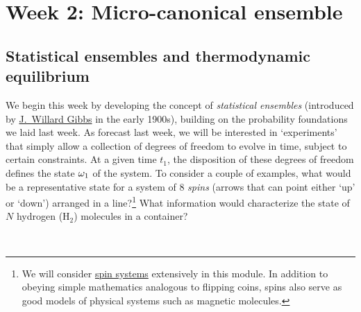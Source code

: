 \renewcommand{\thisweek}{MATH327 Week 2}
\renewcommand{\moddate}{Last modified 18 Feb.~2021}
\setcounter{section}{2}
\setcounter{subsection}{0}
{}
\section*{Week 2: Micro-canonical ensemble}

\subsection{Statistical ensembles and thermodynamic equilibrium}
We begin this week by developing the concept of \textit{statistical ensembles} (introduced by \href{https://en.wikipedia.org/wiki/Josiah_Willard_Gibbs}{J.\ Willard Gibbs} in the early 1900s), building on the probability foundations we laid last week.
As forecast last week, we will be interested in `experiments' that simply allow a collection of degrees of freedom to evolve in time, subject to certain constraints.
At a given time $t_1$, the disposition of these degrees of freedom defines the state $\omega_1$ of the system.
To consider a couple of examples, what would be a representative state for a system of $8$ \textit{spins} (arrows that can point either `up' or `down') arranged in a line?\footnote{We will consider \href{https://en.wikipedia.org/wiki/Spin_model}{spin systems} extensively in this module.  In addition to obeying simple mathematics analogous to flipping coins, spins also serve as good models of physical systems such as magnetic molecules.}
What information would characterize the state of $N$ hydrogen (H$_2$) molecules in a container?
\begin{mdframed}
  \ \\[100 pt]
\end{mdframed}


